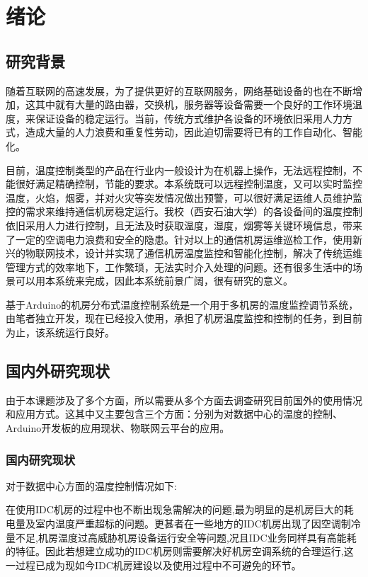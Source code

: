 \section{绪论}

\subsection{研究背景}

随着互联网的高速发展，为了提供更好的互联网服务，网络基础设备的也在不断增加，这其中就有大量的路由器，交换机，服务器等设备需要一个良好的工作环境温度，来保证设备的稳定运行。当前，传统方式维护各设备的环境依旧采用人力方式，造成大量的人力浪费和重复性劳动，因此迫切需要将已有的工作自动化、智能化。

目前，温度控制类型的产品在行业内一般设计为在机器上操作，无法远程控制，不能很好满足精确控制，节能的要求。本系统既可以远程控制温度，又可以实时监控温度，火焰，烟雾，并对火灾等突发情况做出预警，可以很好满足运维人员维护监控的需求来维持通信机房稳定运行。我校（西安石油大学）的各设备间的温度控制依旧采用人力进行控制，且无法及时获取温度，湿度，烟雾等关键环境信息，带来了一定的空调电力浪费和安全的隐患。针对以上的通信机房运维巡检工作，使用新兴的物联网技术，设计并实现了通信机房温度监控和智能化控制，解决了传统运维管理方式的效率地下，工作繁琐，无法实时介入处理的问题。还有很多生活中的场景可以用本系统来完成，因此本系统前景广阔，很有研究的意义。

基于Arduino的机房分布式温度控制系统是一个用于多机房的温度监控调节系统，由笔者独立开发，现在已经投入使用，承担了机房温度监控和控制的任务，到目前为止，该系统运行良好。

\subsection{国内外研究现状}

由于本课题涉及了多个方面，所以需要从多个方面去调查研究目前国外的使用情况和应用方式。这其中又主要包含三个方面：分别为对数据中心的温度的控制、Arduino开发板的应用现状、物联网云平台的应用。

\subsubsection{国内研究现状}

对于数据中心方面的温度控制情况如下:

在使用IDC机房的过程中也不断出现急需解决的问题,最为明显的是机房巨大的耗电量及室内温度严重超标的问题。更甚者在一些地方的IDC机房出现了因空调制冷量不足,机房温度过高威胁机房设备运行安全等问题,况且IDC业务同样具有高能耗的特征。因此若想建立成功的IDC机房则需要解决好机房空调系统的合理运行,这一过程已成为现如今IDC机房建设以及使用过程中不可避免的环节。

